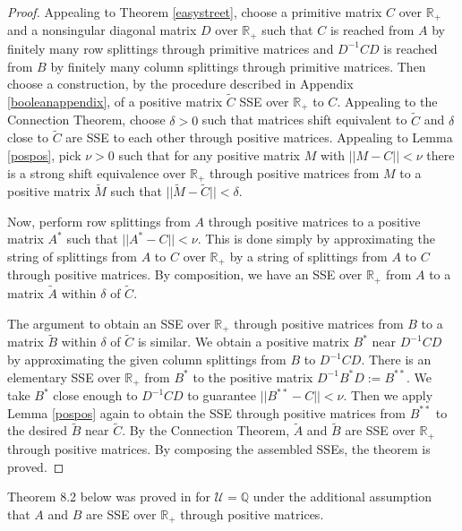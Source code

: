\documentclass{amsart}
\theoremstyle{definition}
\theoremstyle{remark}
\numberwithin{equation}{section}
\begin{document}
{{\begin{proof} 
Appealing to Theorem \ref{easystreet},
choose a primitive matrix $C$ over $\mathbb R_+$ 
 and 
a nonsingular diagonal matrix $D$ over $\mathbb R_+$ 
such that $C$ is reached from $A$ by finitely many row splittings 
through  primitive matrices  and 
 $D^{-1}CD$ is reached from $B$ by finitely many column splittings 
through primitive  matrices. 
Then choose a construction, 
by the procedure described  
 in Appendix \ref{booleanappendix}, 
of a positive matrix 
 $\widetilde C$ SSE over $\mathbb R_+$ to $C$. 
Appealing to the Connection 
Theorem, 
choose $\delta >0$ such that 
matrices shift equivalent to 
$\widetilde C$
and 
$\delta $ close to  
$\widetilde C$ are SSE to each other through positive matrices. 
Appealing to Lemma \ref{pospos}, 
pick $\nu >0$ such that for any positive matrix 
$M$  with $||M-C||
< \nu$ there is a strong shift equivalence over 
$\mathbb R_+$ through positive matrices from $M$ to a positive matrix $\widetilde M$ 
 such that $||\widetilde M - \widetilde C||<\delta$. 

Now, perform row splittings from $A$ through positive matrices 
 to a positive matrix $A^*$ such that 
$||A^*-C||<\nu$. This is done simply by approximating 
the string of splittings from $A$ to $C$ over $\mathbb R_+$ by 
a string of splittings 
 from $A$ to $C$  through positive matrices.
By composition, we have an SSE over $\mathbb R_+$ from $A$ to a matrix 
$\widetilde A$ within $\delta$ of $\widetilde C$.  

The argument to obtain
 an SSE over $\mathbb R_+$ through positive matrices from $B$ to a matrix 
$\widetilde B$ within $\delta$ of $\widetilde C$ is similar. 
 We obtain a positive matrix $B^*$ 
near $D^{-1}CD$ by approximating 
the given column splittings from $B$ to $D^{-1}CD$. 
There is an elementary SSE  over $\mathbb R_+$  from 
$B^*$ to the positive matrix $D^{-1}B^*D:=B^{**}$. 
We take $B^*$ close enough to 
$D^{-1}CD$
to guarantee $||B^{**}-C||<\nu$. Then we apply 
 Lemma \ref{pospos} again to obtain the SSE through positive matrices from 
$B^{**}$ to the desired $\widetilde B$ near $\widetilde C$.
By the Connection Theorem, 
$\widetilde A$ and $\widetilde B$ are SSE over $\mathbb R_+$ through 
positive matrices. By composing the assembled SSEs, the theorem is proved.
\end{proof} 

Theorem 8.2 below was proved in \cite{KR5} for $\mathcal U=\mathbb Q$ 
under the additional assumption that 
$A$ and $B$ are SSE over $ \mathbb R_+$ through positive matrices. 

}}
\end{document}
